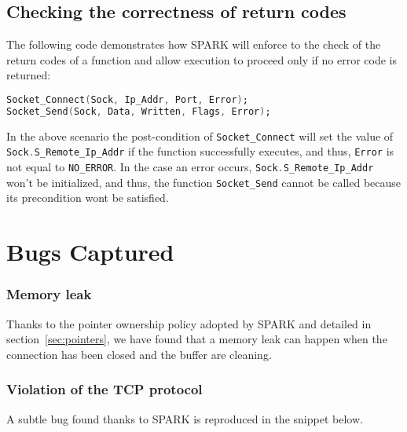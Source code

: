 \documentclass[conference]{IEEEtran}
\def\spark#1{\lstinline[language=Ada]{#1}}
\begin{document}
\subsection{Checking the correctness of return codes}

The following code demonstrates how SPARK will enforce to the check of the return codes of a function and allow execution to proceed only if no error code is returned: 

\begin{lstlisting}[language=Ada,basicstyle=\small\ttfamily]
Socket_Connect(Sock, Ip_Addr, Port, Error); 
Socket_Send(Sock, Data, Written, Flags, Error);
\end{lstlisting} 

In the above scenario the post-condition of \spark{Socket_Connect} will set the value of \spark{Sock.S_Remote_Ip_Addr} if the function successfully executes, and thus, \spark{Error} is not equal to \spark{NO_ERROR}. In the case an error occurs, \spark{Sock.S_Remote_Ip_Addr} won't be initialized, and thus, the function \spark{Socket_Send} cannot be called because its precondition wont be satisfied.


\section{Bugs Captured}
\label{sec:results}

\subsubsection{Memory leak}

Thanks to the pointer ownership policy adopted by SPARK and detailed in
section~\ref{sec:pointers}, we have found that a memory leak can happen when
the connection has been closed and the buffer are cleaning.

\subsubsection{Violation of the TCP protocol}

A subtle bug found thanks to SPARK is
reproduced in the snippet below.
\end{document}
